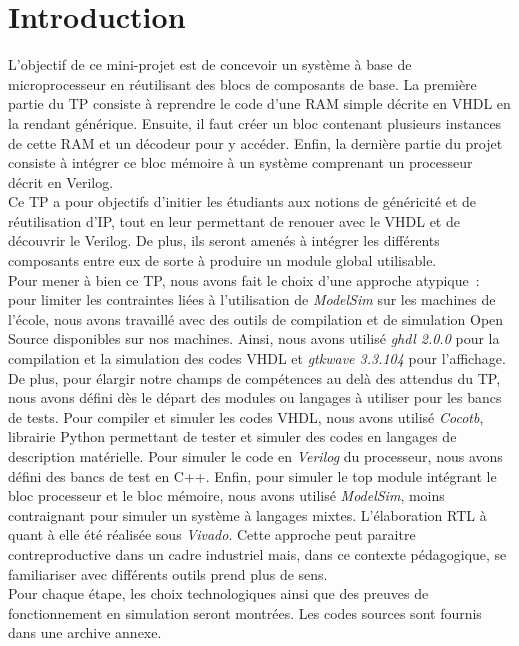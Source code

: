 \section{Introduction}

\gap

\indent L'objectif de ce mini-projet est de concevoir un système à base de microprocesseur en réutilisant des blocs de composants de base. La première partie du TP consiste à reprendre le code d'une RAM simple décrite en VHDL en la rendant générique.
Ensuite, il faut créer un bloc contenant plusieurs instances de cette RAM et un décodeur pour y accéder.
Enfin, la dernière partie du projet consiste à intégrer ce bloc mémoire à un système comprenant un processeur décrit en Verilog. \\
\indent Ce TP a pour objectifs d'initier les étudiants aux notions de généricité et de réutilisation d'\gls{IP}, tout en leur permettant de renouer avec le VHDL et de découvrir le Verilog.
De plus, ils seront amenés à intégrer les différents composants entre eux de sorte à produire un module global utilisable. \\
\indent Pour mener à bien ce TP, nous avons fait le choix d'une approche atypique : pour limiter les contraintes liées à l'utilisation de \textit{ModelSim} sur les machines de l'école, nous avons travaillé avec des outils de compilation et de simulation Open Source disponibles sur nos machines.
Ainsi, nous avons utilisé \textit{ghdl 2.0.0} pour la compilation et la simulation des codes VHDL et \textit{gtkwave 3.3.104} pour l'affichage.
De plus, pour élargir notre champs de compétences au delà des attendus du TP, nous avons défini dès le départ des modules ou langages à utiliser pour les bancs de tests.
Pour compiler et simuler les codes VHDL, nous avons utilisé \textit{Cocotb}, librairie Python permettant de tester et simuler des codes en langages de description matérielle.
Pour simuler le code en \textit{Verilog} du processeur, nous avons défini des bancs de test en C++.
Enfin, pour simuler le top module intégrant le bloc processeur et le bloc mémoire, nous avons utilisé \textit{ModelSim}, moins contraignant pour simuler un système à langages mixtes.
L'élaboration RTL à quant à elle été réalisée sous \textit{Vivado}.
Cette approche peut paraitre contreproductive dans un cadre industriel mais, dans ce contexte pédagogique, se familiariser avec différents outils prend plus de sens. \\
\indent Pour chaque étape, les choix technologiques ainsi que des preuves de fonctionnement en simulation seront montrées.
Les codes sources sont fournis dans une archive annexe.

